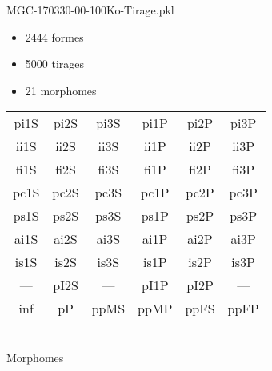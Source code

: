 MGC-170330-00-100Ko-Tirage.pkl
\begin{itemize}
\item 2444 formes
\item 5000 tirages
\item 21 morphomes
\end{itemize}
\begin{center}
\begin{tabular}{cccccc}
\hline
\cellcolor{white}pi1S & \cellcolor{orange}pi2S & \cellcolor{orange}pi3S & \cellcolor{darkgray}pi1P & \cellcolor{white}pi2P & \cellcolor{white}pi3P\\
\cellcolor{brown}ii1S & \cellcolor{brown}ii2S & \cellcolor{brown}ii3S & \cellcolor{lightgray}ii1P & \cellcolor{blue}ii2P & \cellcolor{brown}ii3P\\
\cellcolor{yellow}fi1S & \cellcolor{lime}fi2S & \cellcolor{lime}fi3S & \cellcolor{green}fi1P & \cellcolor{white}fi2P & \cellcolor{green}fi3P\\
\cellcolor{yellow}pc1S & \cellcolor{yellow}pc2S & \cellcolor{yellow}pc3S & \cellcolor{lightgray}pc1P & \cellcolor{magenta}pc2P & \cellcolor{yellow}pc3P\\
\cellcolor{teal}ps1S & \cellcolor{teal}ps2S & \cellcolor{teal}ps3S & \cellcolor{yellow}ps1P & \cellcolor{lightgray}ps2P & \cellcolor{teal}ps3P\\
\cellcolor{lightgray}ai1S & \cellcolor{lightgray}ai2S & \cellcolor{white}ai3S & \cellcolor{blue}ai1P & \cellcolor{black}ai2P & \cellcolor{blue}ai3P\\
\cellcolor{black}is1S & \cellcolor{black}is2S & \cellcolor{lightgray}is3S & \cellcolor{black}is1P & \cellcolor{black}is2P & \cellcolor{black}is3P\\
--- & \cellcolor{white}pI2S & --- & \cellcolor{darkgray}pI1P & \cellcolor{white}pI2P & ---\\
\cellcolor{white}inf & \cellcolor{white}pP & \cellcolor{white}ppMS & \cellcolor{lightgray}ppMP & \cellcolor{magenta}ppFS & \cellcolor{magenta}ppFP\\
\hline
\end{tabular}\\
Morphomes
\end{center}
\bigskip

